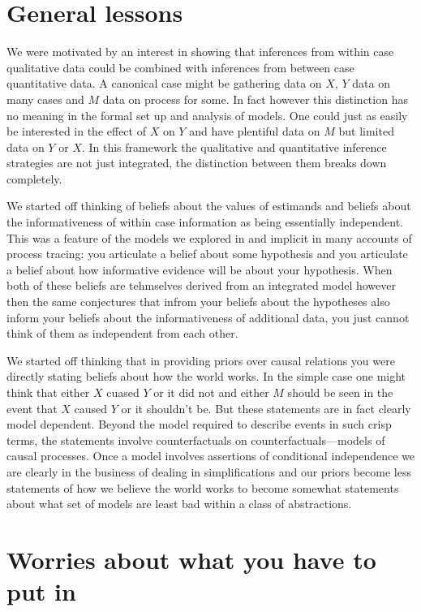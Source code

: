 \documentclass[
  12pt,
]{book}
\begin{document}
\hypertarget{general-lessons}{%
\section{General lessons}\label{general-lessons}}

We were motivated by an interest in showing that inferences from within case qualitative data could be combined with inferences from between case quantitative data. A canonical case might be gathering data on \(X\), \(Y\) data on many cases and \(M\) data on process for some. In fact however this distinction has no meaning in the formal set up and analysis of models. One could just as easily be interested in the effect of \(X\) on \(Y\) and have plentiful data on \(M\) but limited data on \(Y\) or \(X\). In this framework the qualitative and quantitative inference strategies are not just integrated, the distinction between them breaks down completely.

We started off thinking of beliefs about the values of estimands and beliefs about the informativeness of within case information as being essentially independent. This was a feature of the models we explored in \citet{humphreys2015mixing} and implicit in many accounts of process tracing: you articulate a belief about some hypothesis and you articulate a belief about how informative evidence will be about your hypothesis. When both of these beliefs are tehmselves derived from an integrated model however then the same conjectures that infrom your beliefs about the hypotheses also inform your beliefs about the informativeness of additional data, you just cannot think of them as independent from each other.

We started off thinking that in providing priors over causal relations you were directly stating beliefs about how the world works. In the simple case one might think that either \(X\) cuased \(Y\) or it did not and either \(M\) should be seen in the event that \(X\) caused \(Y\) or it shouldn't be. But these statements are in fact clearly model dependent. Beyond the model required to describe events in such crisp terms, the statements involve counterfactuals on counterfactuals---models of causal processes. Once a model involves assertions of conditional independence we are clearly in the business of dealing in simplifications and our priors become less statements of how we believe the world works to become somewhat statements about what set of models are least bad within a class of abstractions.

\hypertarget{worries-about-what-you-have-to-put-in}{%
\section{Worries about what you have to put in}\label{worries-about-what-you-have-to-put-in}}
\end{document}
